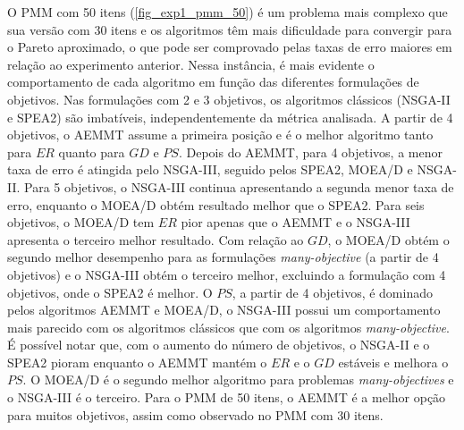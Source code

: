 O PMM com 50 itens (\autoref{fig_exp1_pmm_50}) é um problema mais complexo que sua versão com 30 itens e os algoritmos têm mais dificuldade para convergir para o Pareto aproximado, o que pode ser comprovado pelas taxas de erro maiores em relação ao experimento anterior. Nessa instância, é mais evidente  o comportamento de cada algoritmo em função das diferentes formulações de objetivos. Nas formulações com 2 e 3 objetivos, os algoritmos clássicos (NSGA-II e SPEA2) são imbatíveis, independentemente da métrica analisada. A partir de 4 objetivos, o AEMMT assume a primeira posição e é o melhor algoritmo tanto para $ER$ quanto para $GD$ e $PS$. Depois do AEMMT, para 4 objetivos, a menor taxa de erro é atingida pelo NSGA-III, seguido pelos SPEA2, MOEA/D e NSGA-II. Para 5 objetivos, o NSGA-III continua apresentando a segunda menor taxa de erro, enquanto o MOEA/D obtém resultado melhor que o SPEA2. Para seis objetivos, o MOEA/D tem $ER$ pior apenas que o AEMMT e o NSGA-III apresenta o terceiro melhor resultado. Com relação ao $GD$, o MOEA/D obtém o segundo melhor desempenho para as formulações \textit{many-objective} (a partir de 4 objetivos) e o NSGA-III obtém o terceiro melhor, excluindo a formulação com 4 objetivos, onde o SPEA2 é melhor. O $PS$, a partir de 4 objetivos, é dominado pelos algoritmos AEMMT e MOEA/D, o NSGA-III possui um comportamento mais parecido com os algoritmos clássicos que com os algoritmos \textit{many-objective}.  É possível notar que, com o aumento do número de objetivos, o NSGA-II e o SPEA2 pioram enquanto o AEMMT mantém o $ER$ e o $GD$ estáveis e melhora o $PS$. O MOEA/D é o segundo melhor algoritmo para problemas \textit{many-objectives} e o NSGA-III é o terceiro. Para o PMM de 50 itens, o AEMMT é a melhor opção para muitos objetivos, assim como observado no PMM com 30 itens.

